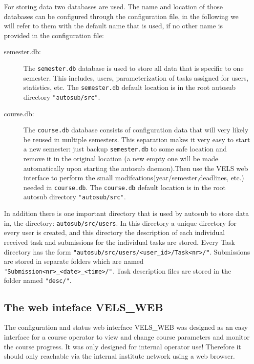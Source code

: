 For storing data two databases are used. The name and location of those databases can be configured
through the configuration file, in the following we will refer to them with the default
name that is used, if no other name is provided in the configuration file:
\begin{description}
\item [semester.db: ] The {\tt semester.db} database is used to store all data that is
    specific to one semester. This includes, users, parameterization of tasks assigned
    for users, statistics, etc. The {\tt semester.db} default location is in the root
    autosub directory {\tt "autosub/src"}.
\item [course.db: ] The {\tt course.db} database consists of configuration data that will
    very likely be reused in multiple semesters. This separation makes it very easy
    to start a new semester: just backup {\tt semester.db} to some safe location and
    remove it in the original location (a new empty one will be made automatically upon 
    starting the autosub daemon).Then use the VELS web interface to perform the small 
    modifcations(year/semester,deadlines, etc.) needed in {\tt course.db}. The
    {\tt course.db} default location is in the root autosub directory {\tt "autosub/src"}.
\end{description}

In addition there is one important directory that is used by autosub to store data in,
the directory: {\tt autosub/src/users}. In this directory a unique directory for every
user is created, and this directory the description of each individual received task and submissions 
for the individual tasks are stored. Every Task directory has the form 
{\tt "autosub/src/users/<user\_id>/Task<nr>/"}. Submissions are stored in separate folders which are named {\tt "Submission<nr>\_<date>\_<time>/"}. Task description files are stored in the folder named {\tt "desc/"}.

\subsection{The web inteface VELS\_WEB} \label{sub:VELS_WEB}

The configuration and status web interface VELS\_WEB was designed as an easy interface
for a course operator to view and change course parameters and monitor the course progress.
It was only designed for internal operator use! Therefore it should only reachable via 
the internal institute network using a web browser.

